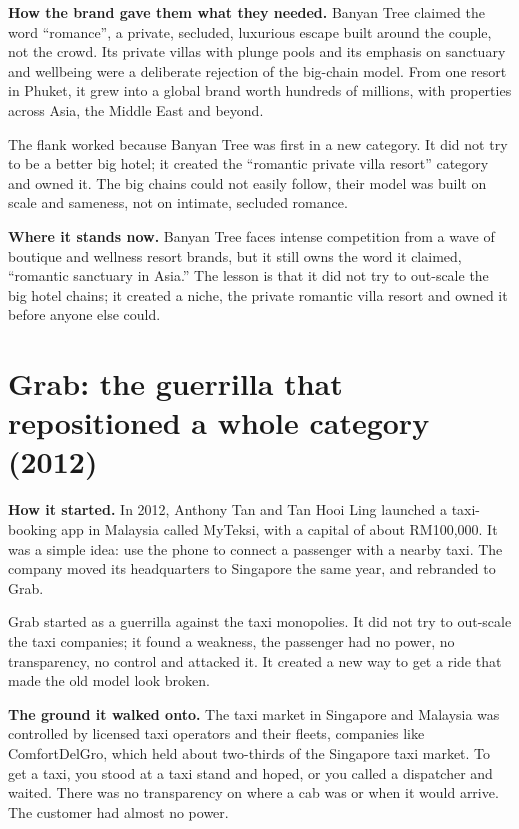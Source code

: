 \documentclass[10pt,twoside,openany]{memoir}
\newcommand{\needspacehead}{\needspace{4\baselineskip}}
\let\oldsection\section
\renewcommand{\section}{\needspacehead\oldsection}
\begin{document}
\textbf{How the brand gave them what they needed.} Banyan Tree claimed
the word ``romance'', a private, secluded, luxurious escape built around
the couple, not the crowd. Its private villas with plunge pools and its
emphasis on sanctuary and wellbeing were a deliberate rejection of the
big-chain model. From one resort in Phuket, it grew into a global brand
worth hundreds of millions, with properties across Asia, the Middle East
and beyond.

The flank worked because Banyan Tree was first in a new category. It did
not try to be a better big hotel; it created the ``romantic private
villa resort'' category and owned it. The big chains could not easily
follow, their model was built on scale and sameness, not on intimate,
secluded romance.

\textbf{Where it stands now.} Banyan Tree faces intense competition from
a wave of boutique and wellness resort brands, but it still owns the
word it claimed, ``romantic sanctuary in Asia.'' The lesson is that it
did not try to out-scale the big hotel chains; it created a niche, the
private romantic villa resort and owned it before anyone else could.

\section{Grab: the guerrilla that repositioned a whole category
(2012)}\label{grab-the-guerrilla-that-repositioned-a-whole-category-2012}

\textbf{How it started.} In 2012, Anthony Tan and Tan Hooi Ling launched
a taxi-booking app in Malaysia called MyTeksi, with a capital of about
RM100,000. It was a simple idea: use the phone to connect a passenger
with a nearby taxi. The company moved its headquarters to Singapore the
same year, and rebranded to Grab.

Grab started as a guerrilla against the taxi monopolies. It did not try
to out-scale the taxi companies; it found a weakness, the passenger had
no power, no transparency, no control and attacked it. It created a new
way to get a ride that made the old model look broken.

\textbf{The ground it walked onto.} The taxi market in Singapore and
Malaysia was controlled by licensed taxi operators and their fleets,
companies like ComfortDelGro, which held about two-thirds of the
Singapore taxi market. To get a taxi, you stood at a taxi stand and
hoped, or you called a dispatcher and waited. There was no transparency
on where a cab was or when it would arrive. The customer had almost no
power.
\end{document}
